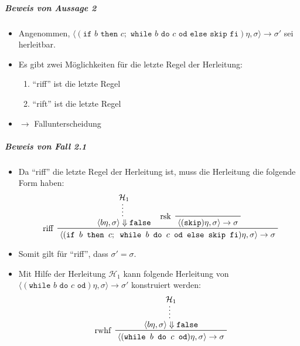 														\subparagraph{Beweis von Aussage 2}
															\begin{itemize}
																\item Angenommen, $ \langle (\texttt{if } b \texttt{ then } c ; \texttt{ while } b \texttt{ do } c \texttt{ od else skip fi}) \eta, \sigma \rangle \rightarrow \sigma' $ sei herleitbar.
																\item Es gibt zwei Möglichkeiten für die letzte Regel der Herleitung:
																	\begin{enumerate}
																		\item \enquote{riff} ist die letzte Regel
																		\item \enquote{rift} ist die letzte Regel
																	\end{enumerate}
																\item $ \rightarrow $ Fallunterscheidung
															\end{itemize}

															\subparagraph{Beweis von Fall 2.1}
																\begin{itemize}
																	\item Da \enquote{riff} die letzte Regel der Herleitung ist, muss die Herleitung die folgende Form haben:
																		\begin{equation*}
																			\prftree[l]
																			{ riff }
																			{ \prfsummary{\mathcal{H} _ 1}{\langle b\eta, \sigma \rangle \Downarrow \texttt{false}} }
																			{ \prftree[l]{ rsk }{ \langle (\texttt{skip})\eta, \sigma \rangle \rightarrow \sigma } }
																			{ \langle (\texttt{if } b \texttt{ then } c ; \texttt{ while } b \texttt{ do } c \texttt{ od else skip fi}) \eta, \sigma \rangle \rightarrow \sigma }
																		\end{equation*}
																	\item Somit gilt für \enquote{riff}, dass $ \sigma' = \sigma $.
																	\item Mit Hilfe der Herleitung $ \mathcal{H} _ 1 $ kann folgende Herleitung von $ \langle (\texttt{while } b \texttt{ do } c \texttt{ od}) \eta, \sigma \rangle \rightarrow \sigma' $ konstruiert werden:
																		\begin{equation*}
																			\prftree[l]
																			{ rwhf }
																			{ \prfsummary{\mathcal{H} _ 1}{\langle b\eta, \sigma \rangle \Downarrow \texttt{false}} }
																			{ \langle (\texttt{while } b \texttt{ do } c \texttt{ od}) \eta, \sigma \rangle \rightarrow \sigma }
																		\end{equation*}
																\end{itemize}

